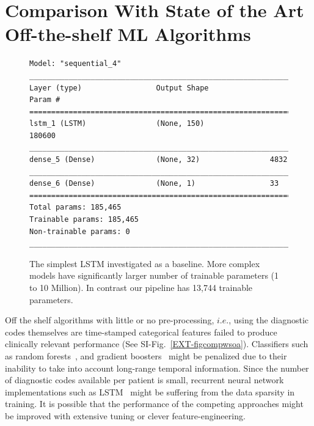 \documentclass[onecolumn,,10pt]{IEEEtran}
\renewcommand{\captionN}[1]{\caption{\color{CadetBlue4!80!black} \sffamily \fontsize{9}{10}\selectfont #1  }}
\begin{document}
\section{Comparison With State of the Art Off-the-shelf ML Algorithms}\label{sec:offtheshelf}
 {\NCOL \begin{figure}[!ht]
    \begin{verbatim}
Model: "sequential_4"
_________________________________________________________________
Layer (type)                 Output Shape              Param #   
=================================================================
lstm_1 (LSTM)                (None, 150)               180600    
_________________________________________________________________
dense_5 (Dense)              (None, 32)                4832      
_________________________________________________________________
dense_6 (Dense)              (None, 1)                 33        
=================================================================
Total params: 185,465
Trainable params: 185,465
Non-trainable params: 0
_________________________________________________________________
\end{verbatim}
    \captionN{\HCOL The simplest LSTM investigated as a baseline. More complex models have significantly larger number of trainable parameters (1 to 10 Million). In contrast our pipeline has 13,744 trainable parameters.}\label{figlstmex}
\end{figure}
}

Off the shelf algorithms with little or no pre-processing, $i.e.$, using the diagnostic codes themselves are time-stamped categorical features failed to produce clinically relevant performance (See SI-Fig.~\ref{EXT-figcompwsoa}). Classifiers such as random forests~\cite{breiman}, and gradient boosters~\cite{friedman} might be penalized due to their inability to take into account long-range temporal information. Since the number of diagnostic codes available per patient is small, recurrent neural network implementations such as LSTM~\cite{hochreiter} might be suffering from the data sparsity in training. It is possible that the performance of the competing approaches might be improved with extensive tuning or clever feature-engineering.
\end{document}
